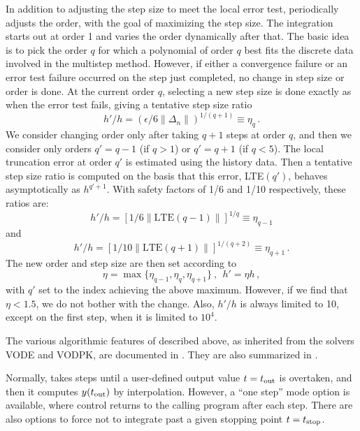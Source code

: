 In addition to adjusting the step size to meet the local error test,
{\cvode} periodically adjusts the order, with the goal of maximizing the
step size.  The integration starts out at order 1 and varies the order
dynamically after that.  The basic idea is to pick the order $q$ for
which a polynomial of order $q$ best fits the discrete data involved
in the multistep method.  However, if either a convergence failure or
an error test failure occurred on the step just completed, no change
in step size or order is done.  At the current order $q$, selecting a
new step size is done exactly as when the error test fails, giving a
tentative step size ratio
\[ h'/h = (\epsilon / 6 \|\Delta_n\| )^{1/(q+1)} \equiv \eta_q \, . \]
We consider changing order only after taking $q+1$ steps at order $q$,
and then we consider only orders $q' = q - 1$ (if $q > 1$) or
$q' = q + 1$ (if $q < 5$).  The local truncation error at order $q'$
is estimated using the history data.  Then a tentative step size ratio
is computed on the basis that this error, LTE$(q')$, behaves
asymptotically as $h^{q'+1}$.  With safety factors of 1/6 and
1/10 respectively, these ratios are:
\[ h'/h = [1 / 6 \|\mbox{LTE}(q-1)\| ]^{1/q} \equiv \eta_{q-1} \]
and
\[ h'/h = [1 / 10 \|\mbox{LTE}(q+1)\| ]^{1/(q+2)} \equiv \eta_{q+1} \, . \]
The new order and step size are then set according to
\[ \eta = \max\{\eta_{q-1},\eta_q,\eta_{q+1}\} ~,~~ h' = \eta h \, , \]
with $q'$ set to the index achieving the above maximum.
However, if we find that $\eta < 1.5$, we do not bother with the
change.  Also, $h'/h$ is always limited to 10, except on the first
step, when it is limited to $10^4$.

The various algorithmic features of {\cvode} described above, as
inherited from the solvers VODE and VODPK, are documented in 
\cite{BBH:89,Byr:92,Hin:00}.  They are also summarized in
\cite{HBGLSSW:04}.

Normally, {\cvode} takes steps until a user-defined output value 
$t = t_{\mbox{\scriptsize out}}$ is overtaken, and then it computes
$y(t_{\mbox{\scriptsize out}})$ by interpolation.  However, a
``one step'' mode option is available, where control returns to the
calling program after each step.  There are also options to force
{\cvode} not to integrate past a given stopping point 
$t = t_{\mbox{\scriptsize stop}}$.


